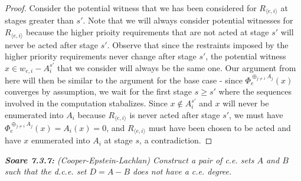 \documentclass{article}
\begin{document}
\begin{enumerate}[label={(\roman*)}]
\begin{proof}
        Consider the potential witness that we has been considered for
        $R_{\langle e,i\rangle}$ at stages greater than $s'$. Note that we
        will always consider potential witnesses for $R_{\langle
        e,i\rangle}$ because the higher prioity requirements that are not
        acted at stage $s'$ will never be acted after stage $s'$.
        Observe that since the restraints imposed by the higher priority
        requirements never change after stage $s'$, the potential witness
        $x\in w_{e,i}-A_i^{s'}$ that we consider will always be the same
        one. Our argument from here will then be similar to the argument
        for the base case - since $\Phi_e^{\oplus_{j\neq i} A_j}(x)$
        converges by assumption, we wait for the first stage $s\geq s'$
        where the sequences involved in the computation stabalizes. Since
        $x\not\in A_i^{s'}$ and $x$ will never be enumerated into $A_i$
        because $R_{\langle e,i\rangle}$ is never acted after stage
        $s'$, we must have $\Phi_e^{\oplus_{j\neq i} A_j}(x)=A_i(x)=0$, and
        $R_{\langle e,i\rangle}$ must have been chosen to be acted and
        have $x$ enumerated into $A_i$ at stage $s$, a contradiction.
      \end{proof}
  \end{enumerate}

\it \textbf{Soare 7.3.7:} (Cooper-Epstein-Lachlan) Construct a pair of c.e.
  sets $A$ and $B$ such that the d.c.e. set $D=A-B$ does not have a c.e.
  degree.
\end{document}
